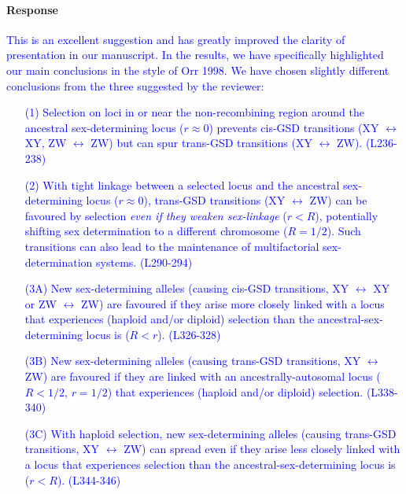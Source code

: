 \documentclass[10pt,letterpaper]{article}
\begin{document}
\noindent\paragraph{Response}
\textcolor{blue}{
This is an excellent suggestion and has greatly improved the clarity of presentation in our manuscript. In the results, we have specifically highlighted our main conclusions in the style of Orr 1998. We have chosen slightly different conclusions from the three suggested by the reviewer: 
\begin{enumerate}
\item[(1)] Selection on loci in or near the non-recombining region around the ancestral sex-determining locus ($r\approx0$) prevents cis-GSD transitions (XY $\leftrightarrow$ XY, ZW $\leftrightarrow$ ZW) but can spur trans-GSD transitions (XY $\leftrightarrow$ ZW). (L236-238)
\item[(2)] With tight linkage between a selected locus and the ancestral sex-determining locus ($r\approx0$), trans-GSD transitions (XY $\leftrightarrow$ ZW) can be favoured by selection \textit{even if they weaken sex-linkage} ($r<R$), potentially shifting sex determination to a different chromosome ($R=1/2$). 
Such transitions can also lead to the maintenance of multifactorial sex-determination systems. (L290-294)
\item[(3A)] New sex-determining alleles (causing cis-GSD transitions, XY $\leftrightarrow$ XY or ZW $\leftrightarrow$ ZW) are favoured if they arise more closely linked with a locus that experiences (haploid and/or diploid) selection than the ancestral-sex-determining locus is ($R<r$). (L326-328)
\item[(3B)] New sex-determining alleles (causing trans-GSD transitions, XY $\leftrightarrow$ ZW) are favoured if they are linked with an ancestrally-autosomal locus ($R<1/2$, $r=1/2$) that experiences (haploid and/or diploid) selection. (L338-340)
\item[(3C)] With haploid selection, new sex-determining alleles (causing trans-GSD transitions, XY $\leftrightarrow$ ZW) can spread even if they arise less closely linked with a locus that experiences selection than the ancestral-sex-determining locus is ($r<R$). (L344-346)

\end{enumerate}}
\end{document}
